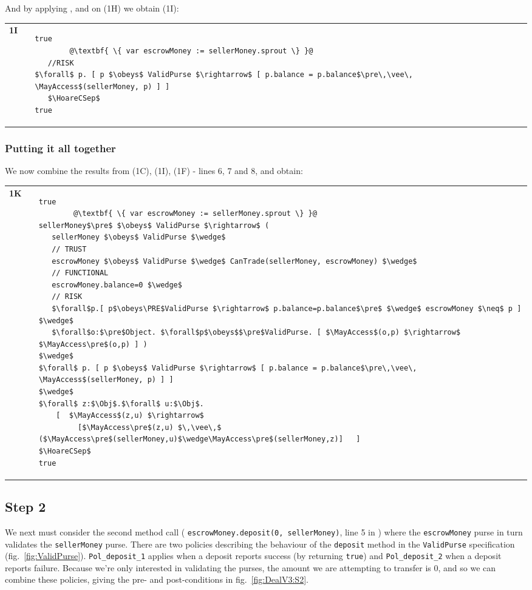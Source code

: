 And by applying , and   on (1H) we obtain (1I):

\begin{tabular}{lll}
{\bf 1I} & &
\begin{lstlisting}[escapechar=@]
true 
        @\textbf{ \{ var escrowMoney := sellerMoney.sprout \} }@
   //RISK
$\forall$ p. [ p $\obeys$ ValidPurse $\rightarrow$ [ p.balance = p.balance$\pre\,\vee\,  \MayAccess$(sellerMoney, p) ] ]
   $\HoareCSep$
true   
   \end{lstlisting}
\end{tabular}



\vspace{.02in}
\subsubsection{Putting it all together } We now combine the results from (1C), (1I), (1F) - lines 6, 7 and 8, and obtain: 

\begin{tabular}{lll}
{\bf 1K} & &
\begin{lstlisting}[escapechar=@]
true
        @\textbf{ \{ var escrowMoney := sellerMoney.sprout \} }@
sellerMoney$\pre$ $\obeys$ ValidPurse $\rightarrow$ (
   sellerMoney $\obeys$ ValidPurse $\wedge$
   // TRUST
   escrowMoney $\obeys$ ValidPurse $\wedge$ CanTrade(sellerMoney, escrowMoney) $\wedge$
   // FUNCTIONAL
   escrowMoney.balance=0 $\wedge$
   // RISK
   $\forall$p.[ p$\obeys\PRE$ValidPurse $\rightarrow$ p.balance=p.balance$\pre$ $\wedge$ escrowMoney $\neq$ p ]  $\wedge$
   $\forall$o:$\pre$Object. $\forall$p$\obeys$$\pre$ValidPurse. [ $\MayAccess$(o,p) $\rightarrow$ $\MayAccess\pre$(o,p) ] )
$\wedge$
$\forall$ p. [ p $\obeys$ ValidPurse $\rightarrow$ [ p.balance = p.balance$\pre\,\vee\,  \MayAccess$(sellerMoney, p) ] ]
$\wedge$
$\forall$ z:$\Obj$.$\forall$ u:$\Obj$.
    [  $\MayAccess$(z,u) $\rightarrow$
         [$\MayAccess\pre$(z,u) $\,\vee\,$ ($\MayAccess\pre$(sellerMoney,u)$\wedge\MayAccess\pre$(sellerMoney,z)]   ]
$\HoareCSep$
true
\end{lstlisting}
\end{tabular}
 

\subsection{Step 2}

We next must consider the second method call (
%
\lstinline+escrowMoney.deposit(0, sellerMoney)+,
%
line 5 in \bothfigs) where the
\lstinline+escrowMoney+ purse in turn validates the
\lstinline+sellerMoney+ purse.
There are two policies describing the behaviour of the
\lstinline+deposit+ method in the
\lstinline+ValidPurse+ specification (fig.~\ref{fig:ValidPurse}).
\lstinline+Pol_deposit_1+ applies when a deposit reports success (by
returning \lstinline+true+) and \lstinline+Pol_deposit_2+ when a
deposit reports failure.  Because we're only interested in validating
the purses, the amount we are attempting to transfer is 0, and so we
can combine these policies, giving the pre- and post-conditions
in fig.~\ref{fig:DealV3:S2}.

